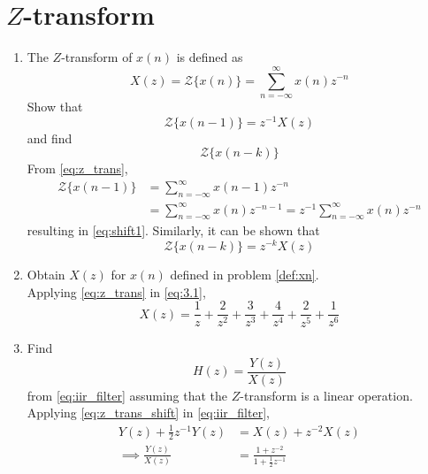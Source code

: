 \documentclass[journal,12pt,twocolumn]{IEEEtran}
\renewcommand\thesection{\arabic{section}}
\begin{document}
\section{$Z$-transform}
\begin{enumerate}[label=\thesection.\arabic*]
\item The $Z$-transform of $x(n)$ is defined as
%
\begin{equation}
\label{eq:z_trans}
X(z)={\mathcal {Z}}\{x(n)\}=\sum _{n=-\infty }^{\infty }x(n)z^{-n}
\end{equation}
%
Show that
\begin{equation}
\label{eq:shift1}
{\mathcal {Z}}\{x(n-1)\} = z^{-1}X(z)
\end{equation}
and find
\begin{equation}
	{\mathcal {Z}}\{x(n-k)\} 
\end{equation}
\solution From \eqref{eq:z_trans},
\begin{align}
{\mathcal {Z}}\{x(n-1)\} &=\sum _{n=-\infty }^{\infty }x(n-1)z^{-n}
\\
&=\sum _{n=-\infty }^{\infty }x(n)z^{-n-1} = z^{-1}\sum _{n=-\infty }^{\infty }x(n)z^{-n}
\end{align}
resulting in \eqref{eq:shift1}. Similarly, it can be shown that
%
\begin{equation}
\label{eq:z_trans_shift}
	{\mathcal {Z}}\{x(n-k)\} = z^{-k}X(z)
\end{equation}
\item Obtain $X(z)$ for $x(n)$ defined in problem 
	\ref{def:xn}.
\\
\newline\solution Applying \eqref{eq:z_trans} in \eqref{eq:3.1},
\begin{equation}
    X(z)=\frac{1}{z}+\frac{2}{z^{2}}+\frac{3}{z^{3}}+\frac{4}{z^{4}}+\frac{2}{z^{5}}+\frac{1}{z^{6}}
\end{equation}
\item Find
%
\begin{equation}
H(z) = \frac{Y(z)}{X(z)}
\end{equation}
%
from  \eqref{eq:iir_filter} assuming that the $Z$-transform is a linear operation.
\\
\solution  Applying \eqref{eq:z_trans_shift} in \eqref{eq:iir_filter},
\begin{align}
Y(z) + \frac{1}{2}z^{-1}Y(z) &= X(z)+z^{-2}X(z)
\\
\implies \frac{Y(z)}{X(z)} &= \frac{1 + z^{-2}}{1 + \frac{1}{2}z^{-1}}
\label{eq:freq_resp}
\end{align}

\end{enumerate}
\end{document}
